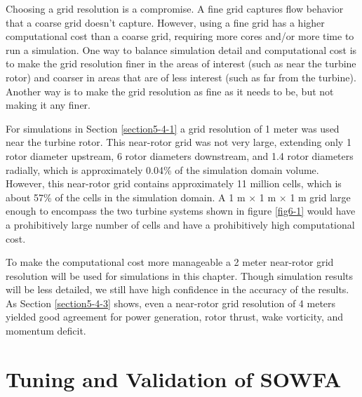 Choosing a grid resolution is a compromise. A fine grid captures flow behavior that a coarse grid doesn't capture. However, using a fine grid has a higher computational cost than a coarse grid, requiring more cores and/or more time to run a simulation. One way to balance simulation detail and computational cost is to make the grid resolution finer in the areas of interest (such as near the turbine rotor) and coarser in areas that are of less interest (such as far from the turbine). Another way is to make the grid resolution as fine as it needs to be, but not making it any finer. 

For simulations in Section \ref{section5-4-1} a grid resolution of 1 meter was used near the turbine rotor. This near-rotor grid was not very large, extending only 1 rotor diameter upstream, 6 rotor diameters downstream, and 1.4 rotor diameters radially, which is approximately 0.04\% of the simulation domain volume. However, this near-rotor grid contains approximately 11 million cells, which is about 57\% of the cells in the simulation domain. A 1 m $\times$ 1 m $\times$ 1 m grid large enough to encompass the two turbine systems shown in figure \ref{fig6-1} would have a prohibitively large number of cells and have a prohibitively high computational cost. 

To make the computational cost more manageable a 2 meter near-rotor grid resolution will be used for simulations in this chapter. Though simulation results will be less detailed, we still have high confidence in the accuracy of the results. As Section \ref{section5-4-3} shows, even a near-rotor grid resolution of 4 meters yielded good agreement for power generation, rotor thrust, wake vorticity, and momentum deficit.  


\section{Tuning and Validation of SOWFA} \label{section6-4}

